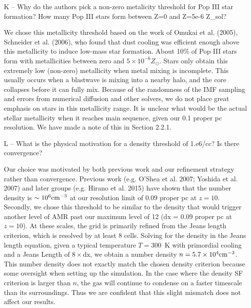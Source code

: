 \documentclass[11pt]{article}
\newenvironment{referee}[1][]{%
    \ignorespaces%
    \begin{mdframed}[style=myquotestyle,#1]%
}{%
    \end{mdframed}%
    \ignorespacesafterend%
}%
\begin{document}
\begin{referee}
K -- Why do the authors pick a non-zero metalicity threshold for Pop III star formation? How many Pop III stars form between Z=0 and Z=5e-6 Z\_sol?
\end{referee}

We chose this metallicity threshold based on the work of Omukai et al. (2005), Schneider et al. (2006), who found that dust cooling was efficient enough above this metallicity to induce low-mass star formation. About 10\% of Pop III stars form with metallicities between zero and $5 \times 10^{-6} Z_\odot$.  Stars only obtain this extremely low (non-zero) metallicity when metal mixing is incomplete.  This usually occurs when a blastwave is mixing into a nearby halo, and the core collapses before it can fully mix.  Because of the randomness of the IMF sampling and errors from numerical diffusion and other solvers, we do not place great emphasis on stars in this metallicity range.  It is unclear what would be the actual stellar metallicity when it reaches main sequence, given our 0.1 proper pc resolution.  We have made a note of this in Section 2.2.1.

\begin{referee}
L -- What is the physical motivation for a density threshold of 1.e6/cc? Is there convergence?
\end{referee}

Our choice was motivated by both previous work and our refinement strategy rather than convergence. Previous work (e.g. O'Shea et al. 2007; Yoshida et al. 2007) and later groups (e.g. Hirano et al. 2015) have shown that the number density is $\sim 10^6 \cubecm$ at our resolution limit of $0.09$ proper pc at $z=10$.  Secondly, we chose this threshold to be similar to the density that would trigger another level of AMR past our maximum level of 12 (dx = 0.09 proper pc at $z=10$).  At these scales, the grid is primarily refined from the Jeans length criterion, which is resolved by at least 8 cells.  Solving for the density in the Jeans length equation, given a typical temperature $T=300$~K with primordial cooling and a Jeans Length of $8 \times \textrm{dx}$, we obtain a number density $n = 5.7 \times 10^4 \cubecm$.  This number density does not exactly match the chosen density criterion because some oversight when setting up the simulation.  In the case where the density SF criterion is larger than $n$, the gas will continue to condense on a faster timescale than its surroundings.  Thus we are confident that this slight mismatch does not affect our results.
\end{document}
